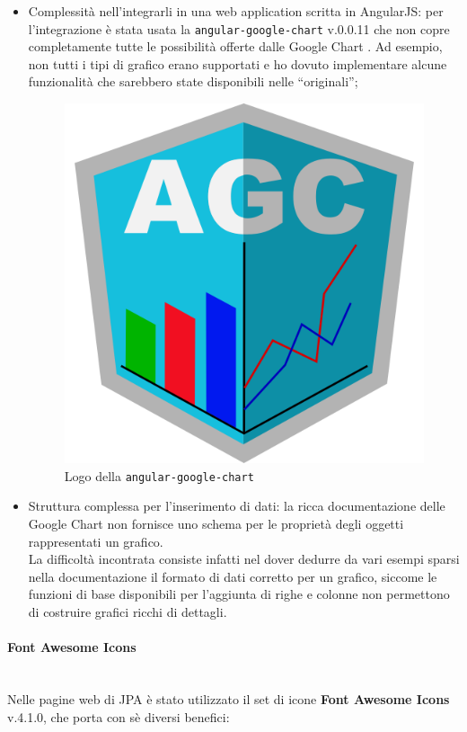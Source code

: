 \begin{itemize}
\item Complessità nell'integrarli in una web application scritta in AngularJS:
  per l'integrazione è stata usata la 
  \texttt{angular-google-chart} v.0.0.11 che non copre completamente tutte le
  possibilità offerte dalle Google Chart . Ad esempio, non tutti i
  tipi di grafico erano supportati e ho dovuto implementare alcune
  funzionalità che sarebbero state disponibili nelle  ``originali'';

\begin{figure}[H]%
\centering
\includegraphics[width=.5\columnwidth]{immagini/ang-goog-chart-logo}
\caption{Logo della  \texttt{angular-google-chart}}%
\label{fig:logo-agc}%
\end{figure}

\item Struttura complessa per l'inserimento di dati: la ricca documentazione
  delle Google Chart  non fornisce uno schema per le proprietà
  degli oggetti rappresentati un grafico. \\
  La difficoltà incontrata consiste infatti nel dover dedurre da vari esempi
  sparsi nella documentazione il formato di dati corretto per un grafico,
  siccome le funzioni di base disponibili per l'aggiunta di righe e colonne
  non permettono di costruire grafici ricchi di dettagli.
\end{itemize}

\paragraph{Font Awesome Icons} \mbox{} \\

Nelle pagine web di JPA è stato utilizzato il set di icone \textbf{Font
Awesome Icons} v.4.1.0, che porta con sè diversi benefici:


